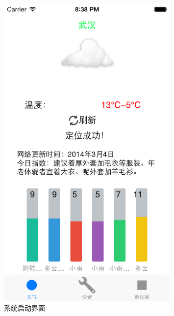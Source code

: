 \documentclass[UTF8,nofonts]{ctexart}
\begin{document}
\begin{figure}[hbt]
\centering
\includegraphics[width=0.8\textwidth]{2.png}
\caption{系统启动界面}
\end{figure}
\end{document}
